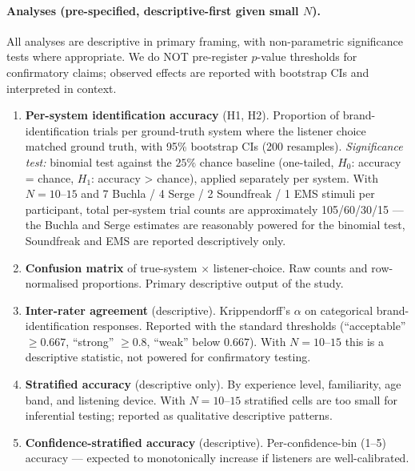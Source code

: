 \paragraph{Analyses (pre-specified, descriptive-first given small $N$).} All analyses are descriptive in primary framing, with non-parametric significance tests where appropriate. We do NOT pre-register $p$-value thresholds for confirmatory claims; observed effects are reported with bootstrap CIs and interpreted in context.
\begin{enumerate}\itemsep0pt
    \item \textbf{Per-system identification accuracy} (H1, H2). Proportion of brand-identification trials per ground-truth system where the listener choice matched ground truth, with 95\% bootstrap CIs (200 resamples). \emph{Significance test:} binomial test against the $25\%$ chance baseline (one-tailed, $H_0$: accuracy = chance, $H_1$: accuracy > chance), applied separately per system. With $N=10$--$15$ and 7 Buchla / 4 Serge / 2 Soundfreak / 1 EMS stimuli per participant, total per-system trial counts are approximately 105/60/30/15 — the Buchla and Serge estimates are reasonably powered for the binomial test, Soundfreak and EMS are reported descriptively only.
    \item \textbf{Confusion matrix} of true-system $\times$ listener-choice. Raw counts and row-normalised proportions. Primary descriptive output of the study.
    \item \textbf{Inter-rater agreement} (descriptive). Krippendorff's $\alpha$ on categorical brand-identification responses. Reported with the standard thresholds (``acceptable'' $\geq 0.667$, ``strong'' $\geq 0.8$, ``weak'' below $0.667$). With $N=10$--$15$ this is a descriptive statistic, not powered for confirmatory testing.
    \item \textbf{Stratified accuracy} (descriptive only). By experience level, familiarity, age band, and listening device. With $N=10$--$15$ stratified cells are too small for inferential testing; reported as qualitative descriptive patterns.
    \item \textbf{Confidence-stratified accuracy} (descriptive). Per-confidence-bin (1--5) accuracy --- expected to monotonically increase if listeners are well-calibrated.
\end{enumerate}

